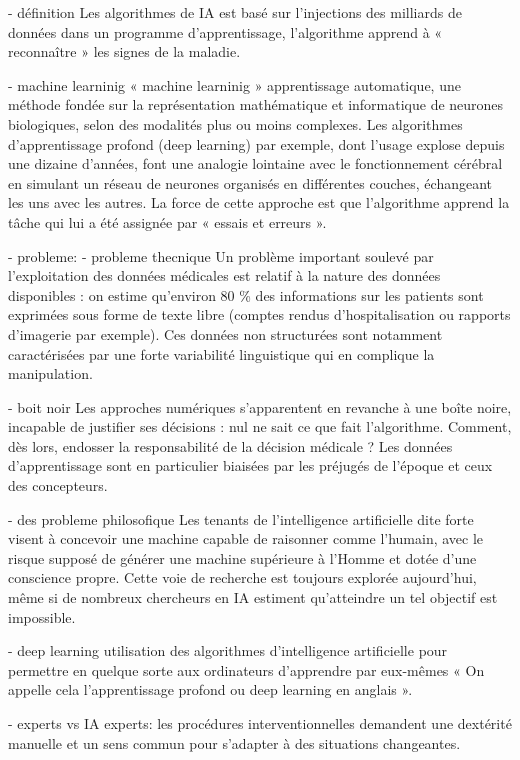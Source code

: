 - définition
    Les algorithmes de IA est basé sur  l'injections des milliards de
    données dans un programme d'apprentissage, l'algorithme  apprend à 
    « reconnaître » les signes de la maladie.

- machine learninig
    « machine learninig » apprentissage automatique, une méthode fondée sur
    la représentation mathématique et informatique de neurones
    biologiques, selon des modalités plus ou moins complexes. Les
    algorithmes d'apprentissage profond (deep learning) par exemple, dont
    l'usage explose depuis une dizaine d'années, font une analogie
    lointaine avec le fonctionnement cérébral en simulant un réseau de
    neurones organisés en différentes couches, échangeant les uns avec les
    autres. La force de cette approche est que l'algorithme apprend la
    tâche qui lui a été assignée par « essais et erreurs ».


- probleme:
- probleme thecnique 
    Un problème important soulevé par l'exploitation des données médicales
    est relatif à la nature des données disponibles : on estime qu'environ
    80 \% des informations sur les patients sont exprimées sous forme de
    texte libre (comptes rendus d'hospitalisation ou rapports d'imagerie
    par exemple). Ces données non structurées sont notamment caractérisées
    par une forte variabilité linguistique qui en complique la manipulation.

- boit noir 
    Les approches numériques s'apparentent en revanche à une boîte
    noire, incapable de justifier ses décisions : nul ne sait ce que
    fait l'algorithme. Comment, dès lors, endosser la responsabilité
    de la décision médicale ? Les données d'apprentissage sont en
    particulier biaisées par les préjugés de l'époque et ceux des
    concepteurs.

- des probleme philosofique 
    Les tenants de l'intelligence artificielle dite forte visent à
    concevoir une machine capable de raisonner comme l'humain, avec le
    risque supposé de générer une machine supérieure à l'Homme et dotée
    d'une conscience propre. Cette voie de recherche est toujours explorée
    aujourd'hui, même si de nombreux chercheurs en IA estiment
    qu'atteindre un tel objectif est impossible. 

- deep learning
    utilisation des algorithmes d'intelligence artificielle pour permettre
    en quelque sorte aux ordinateurs d'apprendre par eux-mêmes « On
    appelle cela l'apprentissage profond ou deep learning en anglais ».


- experts  vs IA 
    experts:
        les procédures interventionnelles demandent une dextérité
        manuelle et un sens commun pour s'adapter à des situations changeantes.

